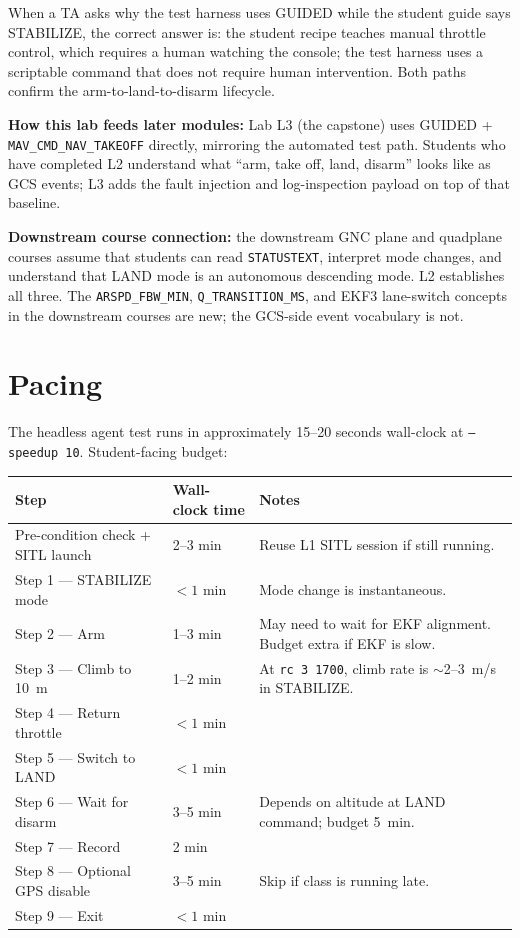 \documentclass[a4paper,11pt,twoside]{article}
\begin{document}
When a TA asks why the test harness uses GUIDED while the student guide says STABILIZE, the correct answer is: the student recipe teaches manual throttle control, which requires a human watching the console; the test harness uses a scriptable command that does not require human intervention. Both paths confirm the arm-to-land-to-disarm lifecycle.

\textbf{How this lab feeds later modules:} Lab L3 (the capstone) uses GUIDED + \texttt{MAV\_CMD\_NAV\_TAKEOFF} directly, mirroring the automated test path. Students who have completed L2 understand what ``arm, take off, land, disarm'' looks like as GCS events; L3 adds the fault injection and log-inspection payload on top of that baseline.

\textbf{Downstream course connection:} the downstream GNC plane and quadplane courses assume that students can read \texttt{STATUSTEXT}, interpret mode changes, and understand that LAND mode is an autonomous descending mode. L2 establishes all three. The \texttt{ARSPD\_FBW\_MIN}, \texttt{Q\_TRANSITION\_MS}, and EKF3 lane-switch concepts in the downstream courses are new; the GCS-side event vocabulary is not.

\section*{Pacing}

The headless agent test runs in approximately 15--20 seconds wall-clock at \texttt{--speedup 10}. Student-facing budget:

\begin{center}\small
\begin{tabular}{|p{5.5cm}|p{3.0cm}|p{6.0cm}|}\hline
\textbf{Step} & \textbf{Wall-clock time} & \textbf{Notes} \\ \hline
Pre-condition check + SITL launch & 2--3 min & Reuse L1 SITL session if still running. \\ \hline
Step 1 --- STABILIZE mode & $<1$ min & Mode change is instantaneous. \\ \hline
Step 2 --- Arm & 1--3 min & May need to wait for EKF alignment. Budget extra if EKF is slow. \\ \hline
Step 3 --- Climb to 10~m & 1--2 min & At \texttt{rc 3 1700}, climb rate is $\sim$2--3~m/s in STABILIZE. \\ \hline
Step 4 --- Return throttle & $<1$ min & \\ \hline
Step 5 --- Switch to LAND & $<1$ min & \\ \hline
Step 6 --- Wait for disarm & 3--5 min & Depends on altitude at LAND command; budget 5~min. \\ \hline
Step 7 --- Record & 2 min & \\ \hline
Step 8 --- Optional GPS disable & 3--5 min & Skip if class is running late. \\ \hline
Step 9 --- Exit & $<1$ min & \\ \hline
\end{tabular}
\end{center}
\end{document}
